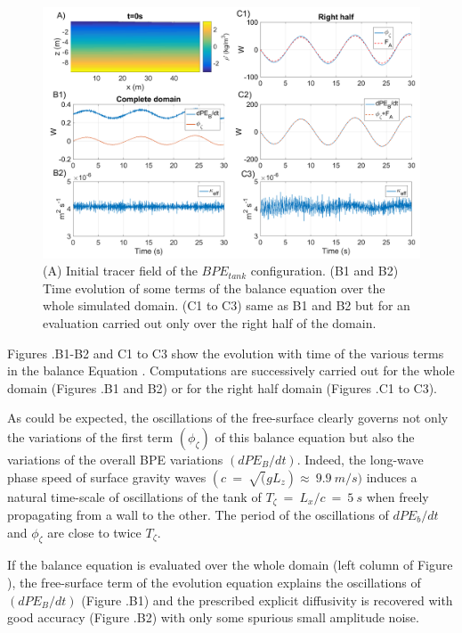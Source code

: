 \begin{figure}[h!]
\centering
\includegraphics[width=1\textwidth]{./CHAP_BPE/Fig_TANK_linS.png}
\caption[Initial tracer field and evaluation of $\kappa_{eff}$ for configuration $BPE_{tank}$]{(A) Initial tracer field of the $BPE_{tank}$ configuration. (B1 and B2) Time evolution of some terms of the balance equation  over the whole simulated domain. (C1 to C3) same as B1 and B2 but for an evaluation carried out only over the right half of the domain.}
\label{figClin}
\end{figure}

Figures .B1-B2 and C1 to C3 show the evolution with time of the various terms in the balance Equation . Computations are successively carried out for the whole domain (Figures .B1 and B2) or for the right half domain (Figures .C1 to C3).

As could be expected, the oscillations of the free-surface clearly governs not only the variations of the first term $(\phi_{\zeta})$ of this balance equation but also the variations of the overall BPE variations $(dPE_B/dt)$. Indeed, the long-wave phase speed of surface gravity waves $(c\ =\ \sqrt(g L_z)\approx\ 9.9\ m/s)$ induces a natural time-scale of oscillations of the tank of $T_{\zeta}\ =\ L_x/c\ =\ 5\ s$ when freely propagating from a wall to the other. The period of the oscillations of $dPE_b/dt$ and $\phi_{\zeta}$ are close to twice $T_{\zeta}$.

If the balance equation is evaluated over the whole domain (left column of Figure ), the free-surface term of the evolution equation explains the oscillations of $(dPE_B/dt)$ (Figure .B1) and the prescribed explicit diffusivity is recovered with good accuracy (Figure .B2) with only some spurious small amplitude noise.

